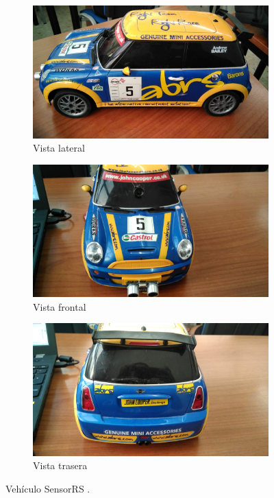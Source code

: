 \begin{figure}[H]
    \centering
    \begin{subfigure}[b]{0.3\textwidth}
        \includegraphics[width=\textwidth]{imagenes/robot/vehiculo_lateral.jpeg}
        \caption{Vista lateral}
        \label{fig:gull}
    \end{subfigure}
    \begin{subfigure}[b]{0.3\textwidth}
        \includegraphics[width=\textwidth]{imagenes/robot/vehiculo_frontal.jpeg}
        \caption{Vista frontal}
        \label{fig:tiger}
    \end{subfigure}
    \begin{subfigure}[b]{0.3\textwidth}
        \includegraphics[width=\textwidth]{imagenes/robot/vehiculo_trasera.jpeg}
        \caption{Vista trasera}
        \label{fig:mouse}
    \end{subfigure}
    \caption{Vehículo SensorRS \protect\footnotemark.}\label{fig:animals}
\end{figure}


